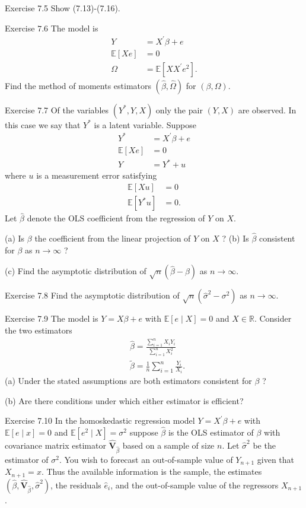 \documentclass[10pt]{article}
\begin{document}
Exercise 7.5 Show (7.13)-(7.16).

Exercise $7.6$ The model is
$$
\begin{aligned}
Y &=X^{\prime} \beta+e \\
\mathbb{E}[X e] &=0 \\
\Omega &=\mathbb{E}\left[X X^{\prime} e^{2}\right] .
\end{aligned}
$$
Find the method of moments estimators $(\widehat{\beta}, \widehat{\Omega})$ for $(\beta, \Omega)$.

Exercise 7.7 Of the variables $\left(Y^{*}, Y, X\right)$ only the pair $(Y, X)$ are observed. In this case we say that $Y^{*}$ is a latent variable. Suppose
$$
\begin{aligned}
Y^{*} &=X^{\prime} \beta+e \\
\mathbb{E}[X e] &=0 \\
Y &=Y^{*}+u
\end{aligned}
$$
where $u$ is a measurement error satisfying
$$
\begin{aligned}
\mathbb{E}[X u] &=0 \\
\mathbb{E}\left[Y^{*} u\right] &=0 .
\end{aligned}
$$
Let $\widehat{\beta}$ denote the OLS coefficient from the regression of $Y$ on $X$.

(a) Is $\beta$ the coefficient from the linear projection of $Y$ on $X$ ? (b) Is $\widehat{\beta}$ consistent for $\beta$ as $n \rightarrow \infty$ ?

(c) Find the asymptotic distribution of $\sqrt{n}(\widehat{\beta}-\beta)$ as $n \rightarrow \infty$.

Exercise 7.8 Find the asymptotic distribution of $\sqrt{n}\left(\widehat{\sigma}^{2}-\sigma^{2}\right)$ as $n \rightarrow \infty$.

Exercise 7.9 The model is $Y=X \beta+e$ with $\mathbb{E}[e \mid X]=0$ and $X \in \mathbb{R}$. Consider the two estimators
$$
\begin{aligned}
&\widehat{\beta}=\frac{\sum_{i=1}^{n} X_{i} Y_{i}}{\sum_{i=1}^{n} X_{i}^{2}} \\
&\widetilde{\beta}=\frac{1}{n} \sum_{i=1}^{n} \frac{Y_{i}}{X_{i}} .
\end{aligned}
$$
(a) Under the stated assumptions are both estimators consistent for $\beta$ ?

(b) Are there conditions under which either estimator is efficient?

Exercise 7.10 In the homoskedastic regression model $Y=X^{\prime} \beta+e$ with $\mathbb{E}[e \mid x]=0$ and $\mathbb{E}\left[e^{2} \mid X\right]=\sigma^{2}$ suppose $\widehat{\beta}$ is the OLS estimator of $\beta$ with covariance matrix estimator $\widehat{\boldsymbol{V}}_{\widehat{\beta}}$ based on a sample of size $n$. Let $\widehat{\sigma}^{2}$ be the estimator of $\sigma^{2}$. You wish to forecast an out-of-sample value of $Y_{n+1}$ given that $X_{n+1}=x$. Thus the available information is the sample, the estimates $\left(\widehat{\beta}, \widehat{\boldsymbol{V}}_{\widehat{\beta}}, \widehat{\sigma}^{2}\right)$, the residuals $\widehat{e}_{i}$, and the out-of-sample value of the regressors $X_{n+1}$.
\end{document}
